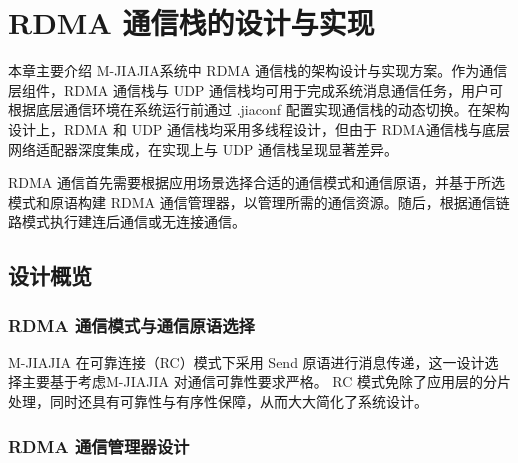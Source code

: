 \chapter{RDMA 通信栈的设计与实现}\label{chap:RDMA}{
    本章主要介绍 M-JIAJIA系统中 RDMA 通信栈的架构设计与实现方案。作为通信层组件，RDMA 通信栈与 UDP 通信栈均可用于完成系统消息通信任务，用户可根据底层通信环境在系统运行前通过 .jiaconf 配置实现通信栈的动态切换。在架构设计上，RDMA 和 UDP 通信栈均采用多线程设计，但由于 RDMA通信栈与底层网络适配器深度集成，在实现上与 UDP 通信栈呈现显著差异。

    RDMA 通信首先需要根据应用场景选择合适的通信模式和通信原语，并基于所选模式和原语构建 RDMA 通信管理器，以管理所需的通信资源。随后，根据通信链路模式执行建连后通信或无连接通信。

    \section{设计概览}\label{sec:RDMA设计概览}

    \subsection{RDMA 通信模式与通信原语选择}

    M-JIAJIA 在可靠连接（RC）模式下采用 Send 原语进行消息传递，这一设计选择主要基于考虑M-JIAJIA 对通信可靠性要求严格。
    RC 模式免除了应用层的分片处理，同时还具有可靠性与有序性保障，从而大大简化了系统设计。




    \subsection{RDMA 通信管理器设计}

}
